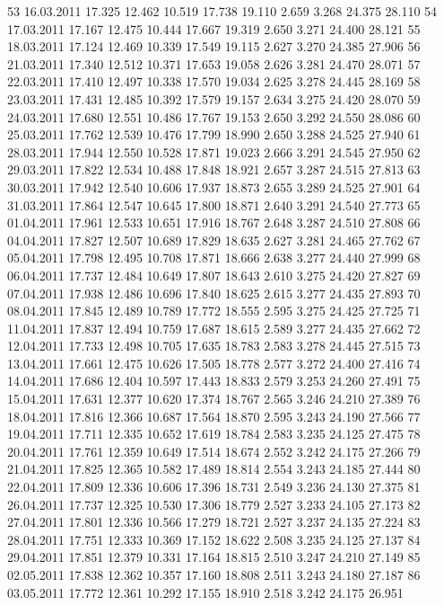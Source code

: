\documentclass[a4paper,11pt]{scrartcl}
\begin{document}
\begin{Schunk}
\begin{Soutput}
53  16.03.2011 17.325 12.462 10.519 17.738 19.110  2.659  3.268 24.375 28.110
54  17.03.2011 17.167 12.475 10.444 17.667 19.319  2.650  3.271 24.400 28.121
55  18.03.2011 17.124 12.469 10.339 17.549 19.115  2.627  3.270 24.385 27.906
56  21.03.2011 17.340 12.512 10.371 17.653 19.058  2.626  3.281 24.470 28.071
57  22.03.2011 17.410 12.497 10.338 17.570 19.034  2.625  3.278 24.445 28.169
58  23.03.2011 17.431 12.485 10.392 17.579 19.157  2.634  3.275 24.420 28.070
59  24.03.2011 17.680 12.551 10.486 17.767 19.153  2.650  3.292 24.550 28.086
60  25.03.2011 17.762 12.539 10.476 17.799 18.990  2.650  3.288 24.525 27.940
61  28.03.2011 17.944 12.550 10.528 17.871 19.023  2.666  3.291 24.545 27.950
62  29.03.2011 17.822 12.534 10.488 17.848 18.921  2.657  3.287 24.515 27.813
63  30.03.2011 17.942 12.540 10.606 17.937 18.873  2.655  3.289 24.525 27.901
64  31.03.2011 17.864 12.547 10.645 17.800 18.871  2.640  3.291 24.540 27.773
65  01.04.2011 17.961 12.533 10.651 17.916 18.767  2.648  3.287 24.510 27.808
66  04.04.2011 17.827 12.507 10.689 17.829 18.635  2.627  3.281 24.465 27.762
67  05.04.2011 17.798 12.495 10.708 17.871 18.666  2.638  3.277 24.440 27.999
68  06.04.2011 17.737 12.484 10.649 17.807 18.643  2.610  3.275 24.420 27.827
69  07.04.2011 17.938 12.486 10.696 17.840 18.625  2.615  3.277 24.435 27.893
70  08.04.2011 17.845 12.489 10.789 17.772 18.555  2.595  3.275 24.425 27.725
71  11.04.2011 17.837 12.494 10.759 17.687 18.615  2.589  3.277 24.435 27.662
72  12.04.2011 17.733 12.498 10.705 17.635 18.783  2.583  3.278 24.445 27.515
73  13.04.2011 17.661 12.475 10.626 17.505 18.778  2.577  3.272 24.400 27.416
74  14.04.2011 17.686 12.404 10.597 17.443 18.833  2.579  3.253 24.260 27.491
75  15.04.2011 17.631 12.377 10.620 17.374 18.767  2.565  3.246 24.210 27.389
76  18.04.2011 17.816 12.366 10.687 17.564 18.870  2.595  3.243 24.190 27.566
77  19.04.2011 17.711 12.335 10.652 17.619 18.784  2.583  3.235 24.125 27.475
78  20.04.2011 17.761 12.359 10.649 17.514 18.674  2.552  3.242 24.175 27.266
79  21.04.2011 17.825 12.365 10.582 17.489 18.814  2.554  3.243 24.185 27.444
80  22.04.2011 17.809 12.336 10.606 17.396 18.731  2.549  3.236 24.130 27.375
81  26.04.2011 17.737 12.325 10.530 17.306 18.779  2.527  3.233 24.105 27.173
82  27.04.2011 17.801 12.336 10.566 17.279 18.721  2.527  3.237 24.135 27.224
83  28.04.2011 17.751 12.333 10.369 17.152 18.622  2.508  3.235 24.125 27.137
84  29.04.2011 17.851 12.379 10.331 17.164 18.815  2.510  3.247 24.210 27.149
85  02.05.2011 17.838 12.362 10.357 17.160 18.808  2.511  3.243 24.180 27.187
86  03.05.2011 17.772 12.361 10.292 17.155 18.910  2.518  3.242 24.175 26.951

\end{Soutput}
\end{Schunk}
\end{document}
